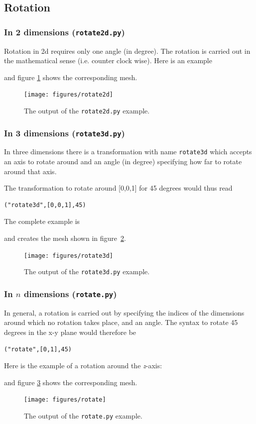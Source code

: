 \documentclass[10pt,a4paper]{book}
\newcommand{\py}[1]{\texttt{\color{blue}#1}}
\begin{document}
\subsection{Rotation}


\subsubsection{In 2 dimensions (\texttt{rotate2d.py})}

Rotation in 2d requires only one angle (in degree). The rotation is carried out in the mathematical sense (i.e. counter clock wise). Here is an example

and figure \ref{fig:rotate2d} shows the corresponding mesh.
\begin{figure}[tbhp]
\centerline{\texttt{[image: figures/rotate2d]}}
\caption{\label{fig:rotate2d} The output of the \py{rotate2d.py} example.}
\end{figure}

\subsubsection{In 3 dimensions (\texttt{rotate3d.py})}
In three dimensions there is a transformation with name \py{rotate3d}
which accepts an axis to rotate around and an angle (in degree)
specifying how far to rotate around that axis.

The transformation to rotate around [0,0,1] for 45 degrees would thus read
\begin{lstlisting}
("rotate3d",[0,0,1],45)
\end{lstlisting}
The complete example is
 
and creates the mesh shown in figure~\ref{fig:rotate3d}.
\begin{figure}[tbhp]
\centerline{\texttt{[image: figures/rotate3d]}}
\caption{\label{fig:rotate3d} The output of the \py{rotate3d.py} example.}
\end{figure}



\subsubsection{In $n$ dimensions (\texttt{rotate.py})}
In general, a rotation is carried out by specifying the indices of the
dimensions around which no rotation takes place, and an angle. The syntax to rotate 45 degrees in the x-y plane would therefore be
\begin{lstlisting}
("rotate",[0,1],45)
\end{lstlisting}
Here is the example of a rotation around the \textit{z}-axis:
 
and figure \ref{fig:rotate} shows the corresponding mesh.
\begin{figure}[tbhp]
\centerline{\texttt{[image: figures/rotate]}}
\caption{\label{fig:rotate} The output of the \py{rotate.py} example.}
\end{figure}
\end{document}
